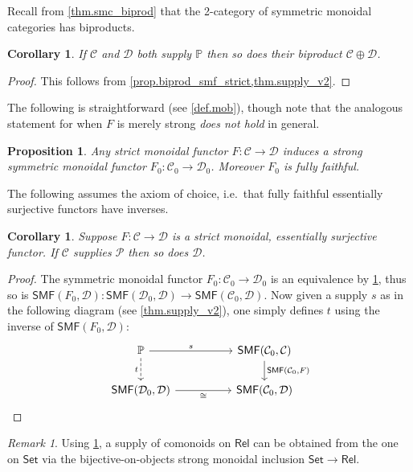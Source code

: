 \documentclass[11pt, oneside, article]{memoir}
\theoremstyle{plain}
\newtheorem{proposition}[theorem]{Proposition}
\newtheorem{corollary}[theorem]{Corollary}
\theoremstyle{definition}
\theoremstyle{remark}
\newtheorem{remark}[theorem]{Remark}
\newcommand{\cat}[1]{\mathcal{#1}}%
\newcommand{\Cat}[1]{{\mathsf{#1}}}%
\newcommand{\smset}{\Cat{Set}}
\newcommand{\smf}{\Cat{SMF}}
\newcommand{\pp}{\mathbb{P}}
\newcommand{\mob}[1]{#1_0}
\newcommand{\rel}{\Cat{Rel}}
\begin{document}
Recall from \cref{thm.smc_biprod} that the 2-category of symmetric monoidal categories has biproducts.

\begin{corollary}
If $\cat{C}$ and $\cat{D}$ both supply $\pp$ then so does their biproduct $\cat{C}\oplus\cat{D}$.
\end{corollary}
\begin{proof}
This follows from \cref{prop.biprod_smf_strict,thm.supply_v2}.
\end{proof}

The following is straightforward (see \cref{def.mob}), though note that the analogous statement for when $F$ is merely strong \emph{does not hold} in general.
 
\begin{proposition}\label{prop.strict_f_objects}
Any strict monoidal functor $F\colon\cat{C}\to\cat{D}$ induces a strong symmetric monoidal functor $\mob{F}\colon\mob{\cat{C}}\to\mob{\cat{D}}$. Moreover $\mob{F}$ is fully faithful.
\end{proposition}

The following assumes the axiom of choice, i.e.\ that fully faithful essentially surjective functors have inverses.

\begin{corollary}\label{cor.strong_bo}
Suppose $F\colon\cat{C}\to\cat{D}$ is a strict monoidal, essentially surjective functor. If $\cat{C}$ supplies $\cat{P}$ then so does $\cat{D}$.
\end{corollary}
\begin{proof}
The symmetric monoidal functor $\mob{F}\colon\mob{\cat{C}}\to\mob{\cat{D}}$ is an equivalence by \cref{prop.strict_f_objects}, thus so is $\smf(\mob{F},\cat{D})\colon\smf(\mob{\cat{D}},\cat{D})\to\smf(\mob{\cat{C}},\cat{D})$. Now given a supply $s$ as in the following diagram (see \cref{thm.supply_v2}), one simply defines $t$ using the inverse of $\smf(\mob{F},\cat{D})$:
\[
\begin{tikzcd}[column sep=50pt]
	\pp\ar[r, "s"]\ar[d, dashed, "t"']&
	\smf(\mob{\cat{C}},\cat{C})\ar[d, "{\smf(\mob{\cat{C}},F)}"]\\
	\smf(\mob{\cat{D}},\cat{D})\ar[r, "\cong"']&
	\smf(\mob{\cat{C}},\cat{D})
\end{tikzcd}
\qedhere
\]
\end{proof}

\begin{remark}
Using \cref{cor.strong_bo}, a supply of comonoids on $\rel$ can be obtained from the one on $\smset$ via the bijective-on-objects strong monoidal inclusion $\smset\to\rel$.
\end{remark}
\end{document}
